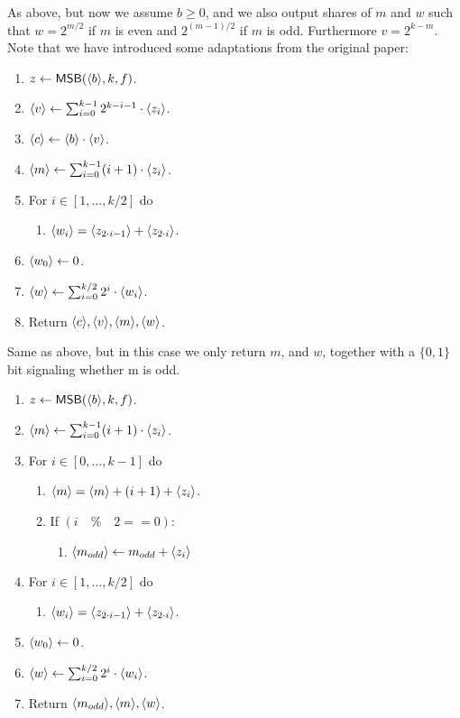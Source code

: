 As above, but now we assume $b \ge 0$, and we also
output shares of $m$ and $w$ such that $w=2^{m/2}$
if $m$ is even and $2^{(m-1)/2}$ if $m$ is odd. Furthermore $v = 2^{k-m}$. Note that we have introduced some adaptations from the original paper:
\begin{enumerate}
\item $z \leftarrow \mathsf{MSB}(\langle b \rangle,k,f)$.
\item $\langle v \rangle \leftarrow \sum_{i=0}^{k-1} 2^{k-i-1} \cdot \langle z_i \rangle$.
\item $\langle c \rangle \leftarrow \langle b \rangle \cdot \langle v \rangle$.
\item $\langle m \rangle \leftarrow \sum_{i=0}^{k-1} (i+1) \cdot \langle z_i \rangle$. 
\item For $i \in [1,\ldots,k/2]$ do
\begin{enumerate}
	\item $\langle w_i \rangle=\langle z_{2\cdot i-1} \rangle+\langle z_{2\cdot i} \rangle$.
\end{enumerate}
\item $\langle w_0 \rangle \leftarrow 0$. 
\item $\langle w \rangle \leftarrow \sum_{i=0}^{k/2} 2^i \cdot \langle w_i \rangle$.
\item Return $\langle c \rangle, \langle v \rangle, \langle m \rangle, \langle w \rangle$.
\end{enumerate}

Same as above, but in this case we only return $m$, and $w$, together with a $\{0,1\}$ bit signaling whether m is odd. 

\begin{enumerate}
\item $z \leftarrow \mathsf{MSB}(\langle b \rangle,k,f)$.

\item $\langle m \rangle \leftarrow \sum_{i=0}^{k-1} (i+1) \cdot \langle z_i \rangle$. 
\item For $i \in [0,\ldots,k-1]$ do
\begin{enumerate}
	\item $\langle m \rangle=\langle m \rangle+ (i+1) +\langle z_{i} \rangle$.
	\item If $(i \quad \% \quad 2 == 0)$:
	\begin{enumerate}
	    \item $\langle m_{odd} \rangle \leftarrow m_{odd} + \langle z_{i} \rangle$
	\end{enumerate}
\end{enumerate}
\item For $i \in [1,\ldots,k/2]$ do
\begin{enumerate}
	\item $\langle w_i \rangle=\langle z_{2\cdot i-1} \rangle+\langle z_{2\cdot i} \rangle$.
\end{enumerate}
\item $\langle w_0 \rangle \leftarrow 0$. 
\item $\langle w \rangle \leftarrow \sum_{i=0}^{k/2} 2^i \cdot \langle w_i \rangle$.

\item Return $\langle m_{odd} \rangle, \langle m \rangle, \langle w \rangle$.
\end{enumerate}


